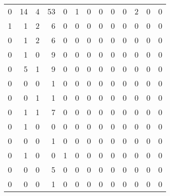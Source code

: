 \begin{tabular}{rrrrrrrrrrrrr}
       0 &      14 &          4 &              53 &                0 &       1 &          0 &          0 &         0 &         0 &      2 &             0 &         0 \\
       1 &       1 &          2 &               6 &                0 &       0 &          0 &          0 &         0 &         0 &      0 &             0 &         0 \\
       0 &       1 &          2 &               6 &                0 &       0 &          0 &          0 &         0 &         0 &      0 &             0 &         0 \\
       0 &       1 &          0 &               9 &                0 &       0 &          0 &          0 &         0 &         0 &      0 &             0 &         0 \\
       0 &       5 &          1 &               9 &                0 &       0 &          0 &          0 &         0 &         0 &      0 &             0 &         0 \\
       0 &       0 &          0 &               1 &                0 &       0 &          0 &          0 &         0 &         0 &      0 &             0 &         0 \\
       0 &       0 &          1 &               1 &                0 &       0 &          0 &          0 &         0 &         0 &      0 &             0 &         0 \\
       0 &       1 &          1 &               7 &                0 &       0 &          0 &          0 &         0 &         0 &      0 &             0 &         0 \\
       0 &       1 &          0 &               0 &                0 &       0 &          0 &          0 &         0 &         0 &      0 &             0 &         0 \\
       0 &       0 &          0 &               1 &                0 &       0 &          0 &          0 &         0 &         0 &      0 &             0 &         0 \\
       0 &       1 &          0 &               0 &                1 &       0 &          0 &          0 &         0 &         0 &      0 &             0 &         0 \\
       0 &       0 &          0 &               5 &                0 &       0 &          0 &          0 &         0 &         0 &      0 &             0 &         0 \\
       0 &       0 &          0 &               1 &                0 &       0 &          0 &          0 &         0 &         0 &      0 &             0 &         0 \\

\end{tabular}
